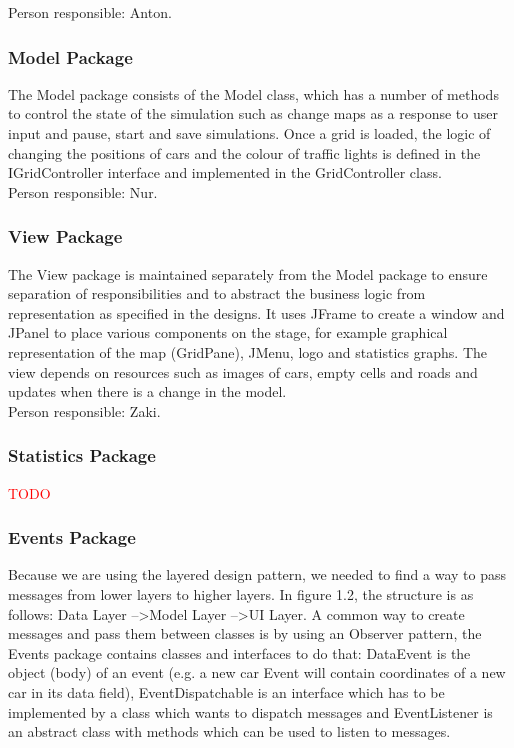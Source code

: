 \documentclass{article}
\begin{document}
	\noindent
	Person responsible: Anton. 
	
	\subsubsection{Model Package}
	The Model package consists of the Model class, which has a number of methods to control the state of the simulation such as change maps as a response to user input and pause, start and save simulations. 
	Once a grid is loaded, the logic of changing the positions of cars and the colour of traffic lights is defined in the IGridController interface and implemented in the GridController class.\\
	
	\noindent
	Person responsible: Nur. 
	
	\subsubsection{View Package}
	The View package is maintained separately from the Model package to ensure separation of responsibilities and to abstract the business logic from representation as specified in the designs. 
	It uses JFrame to create a window and JPanel to place various components on the stage, for example graphical representation of the map (GridPane), JMenu, logo and statistics graphs. 
	The view depends on resources such as images of cars, empty cells and roads and updates when there is a change in the model.\\
	
	\noindent
	Person responsible: Zaki.
	
	\subsubsection{Statistics Package}
	\textcolor{red}{TODO}
	
	\subsubsection{Events Package}
	Because we are using the layered design pattern, we needed to find a way to pass messages from lower layers to higher layers. In figure 1.2, the structure is as follows: Data Layer --\textgreater Model Layer --\textgreater UI Layer. 
	A common way to create messages and pass them between classes is by using an Observer pattern, the Events package contains classes and interfaces to do that: DataEvent is the object (body) of an event (e.g. a new car Event will contain coordinates of a new car in its data field), EventDispatchable is an interface which has to be implemented by a class which wants to dispatch messages and EventListener is an abstract class with methods which can be used to listen to messages.\\
	
\end{document}

